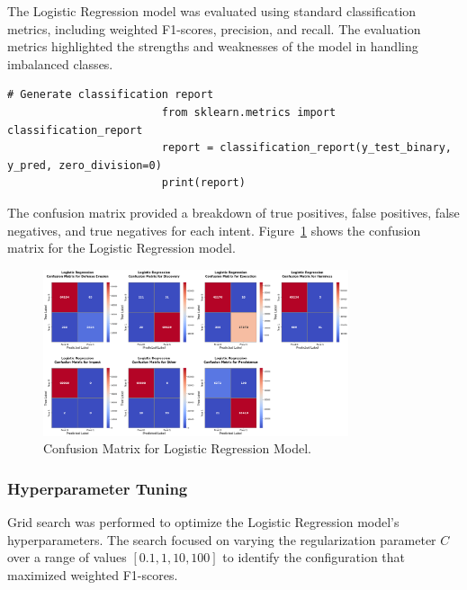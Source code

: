             The Logistic Regression model was evaluated using standard classification metrics, including weighted F1-scores, precision, and recall. The evaluation metrics highlighted the strengths and weaknesses of the model in handling imbalanced classes. 

                \begin{lstlisting}[caption={Generate classification report}, label={lst:logistic_regression_eval}]
                        # Generate classification report
                        from sklearn.metrics import classification_report
                        report = classification_report(y_test_binary, y_pred, zero_division=0)
                        print(report)
                \end{lstlisting}

            The confusion matrix provided a breakdown of true positives, false positives, false negatives, and true negatives for each intent. Figure~\ref{fig:logistic_cm} shows the confusion matrix for the Logistic Regression model.

            \begin{figure}[H]
                \centering
                \includegraphics[width=0.8\textwidth]{../figures/plots/section2/Logistic_Regression_confusion_matrices.png}
                \caption{Confusion Matrix for Logistic Regression Model.}
                \label{fig:logistic_cm}
            \end{figure}

        \subsubsection{Hyperparameter Tuning \\}

            Grid search was performed to optimize the Logistic Regression model's hyperparameters. The search focused on varying the regularization parameter \( C \) over a range of values \([0.1, 1, 10, 100]\) to identify the configuration that maximized weighted F1-scores.

